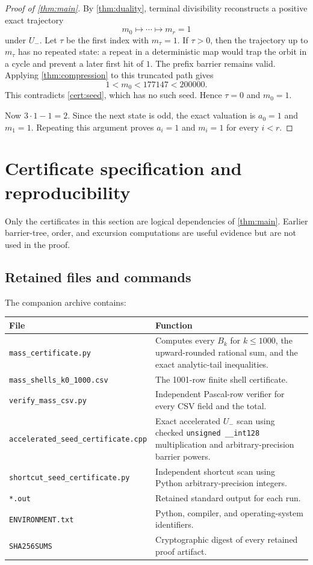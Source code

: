 \documentclass[11pt]{article}
\theoremstyle{definition}
\theoremstyle{remark}
\newcommand{\Um}{U_{-}}
\begin{document}
\begin{proof}[Proof of \cref{thm:main}]
By \cref{thm:duality}, terminal divisibility reconstructs a positive exact
trajectory
\[
 m_0\longmapsto\cdots\longmapsto m_r=1
\]
under $\Um$.  Let $\tau$ be the first index with $m_\tau=1$.  If
$\tau>0$, then the trajectory up to $m_\tau$ has no repeated state: a repeat
in a deterministic map would trap the orbit in a cycle and prevent a later
first hit of $1$.  The prefix barrier remains valid.  Applying
\cref{thm:compression} to this truncated path gives
\[
 1<m_0<177147<200000.
\]
This contradicts \cref{cert:seed}, which has no such seed.  Hence
$\tau=0$ and $m_0=1$.

Now $3\cdot1-1=2$.  Since the next state is odd, the exact valuation is
$a_0=1$ and $m_1=1$.  Repeating this argument proves
$a_i=1$ and $m_i=1$ for every $i<r$.
\end{proof}

\section{Certificate specification and reproducibility}\label{sec:certificates}

Only the certificates in this section are logical dependencies of
\cref{thm:main}.  Earlier barrier-tree, order, and excursion computations are
useful evidence but are not used in the proof.

\subsection{Retained files and commands}

The companion archive contains:
\begin{center}
\begin{tabularx}{\textwidth}{@{}lX@{}}
\toprule
File & Function\\
\midrule
\texttt{mass\_certificate.py} & Computes every $B_k$ for $k\le1000$, the upward-rounded rational sum, and the exact analytic-tail inequalities.\\
\texttt{mass\_shells\_k0\_1000.csv} & The 1001-row finite shell certificate.\\
\texttt{verify\_mass\_csv.py} & Independent Pascal-row verifier for every CSV field and the total.\\
\texttt{accelerated\_seed\_certificate.cpp} & Exact accelerated $\Um$ scan using checked \texttt{unsigned \_\_int128} multiplication and arbitrary-precision barrier powers.\\
\texttt{shortcut\_seed\_certificate.py} & Independent shortcut scan using Python arbitrary-precision integers.\\
\texttt{*.out} & Retained standard output for each run.\\
\texttt{ENVIRONMENT.txt} & Python, compiler, and operating-system identifiers.\\
\texttt{SHA256SUMS} & Cryptographic digest of every retained proof artifact.\\
\bottomrule
\end{tabularx}
\end{center}
\end{document}
